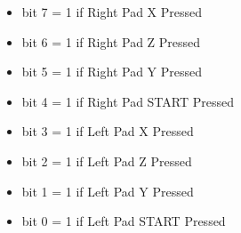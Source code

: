 \begin{itemize}
\item bit 7 = 1 if Right Pad X Pressed
\item bit 6 = 1 if Right Pad Z Pressed
\item bit 5 = 1 if Right Pad Y Pressed
\item bit 4 = 1 if Right Pad START Pressed
\item bit 3 = 1 if Left Pad X Pressed
\item bit 2 = 1 if Left Pad Z Pressed
\item bit 1 = 1 if Left Pad Y Pressed
\item bit 0 = 1 if Left Pad START Pressed
\end{itemize}
